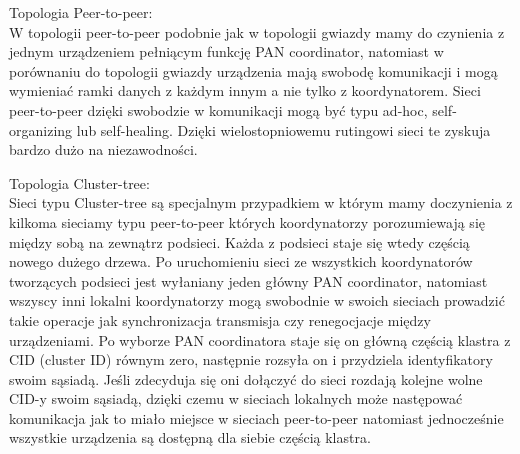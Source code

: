 \par 
Topologia Peer-to-peer:\\ 
\tab		W topologii peer-to-peer podobnie jak w topologii gwiazdy mamy do czynienia z jednym urządzeniem pełniącym funkcję PAN coordinator, natomiast w porównaniu do topologii gwiazdy urządzenia mają swobodę komunikacji i mogą wymieniać ramki danych z każdym innym a nie tylko z koordynatorem. Sieci peer-to-peer dzięki swobodzie w komunikacji mogą być typu ad-hoc, self-organizing lub self-healing. Dzięki wielostopniowemu rutingowi sieci te zyskuja bardzo dużo na niezawodności.\\
\par
Topologia Cluster-tree:\\ 
\tab		Sieci typu Cluster-tree są specjalnym przypadkiem w którym mamy doczynienia z kilkoma sieciamy typu peer-to-peer których koordynatorzy porozumiewają się między sobą na zewnątrz podsieci. Każda z podsieci staje się wtedy częścią nowego dużego drzewa. Po uruchomieniu sieci ze wszystkich koordynatorów tworzących podsieci jest wyłaniany jeden główny PAN coordinator, natomiast wszyscy inni lokalni koordynatorzy mogą swobodnie w swoich sieciach prowadzić takie operacje jak synchronizacja transmisja czy renegocjacje między urządzeniami. Po wyborze PAN coordinatora staje się on główną częścią klastra z CID (cluster ID) równym zero, następnie rozsyła on i przydziela identyfikatory swoim sąsiadą. Jeśli zdecyduja się oni dołączyć do sieci rozdają kolejne wolne CID-y swoim sąsiadą, dzięki czemu w sieciach lokalnych może następować komunikacja jak to miało miejsce w sieciach peer-to-peer natomiast jednocześnie wszystkie urządzenia są dostępną dla siebie częścią klastra.\\

\clearpage 